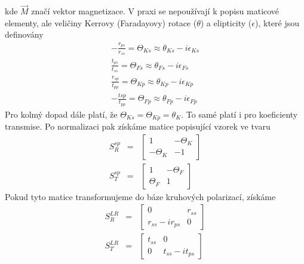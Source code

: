 kde $\vec{M}$ značí vektor magnetizace.
V praxi se nepoužívají k popisu maticové elementy, ale veličiny Kerrovy (Faradayovy) rotace ($\theta$)  a elipticity ($\epsilon$), které jsou definovány
\begin{eqnarray}
-\frac{r_{ps}}{r_{ss}}=\Theta_{Ks} \approx \theta_{Ks} -i\epsilon_{Ks} \\
\frac{t_{ps}}{t_{ss}}=\Theta_{Fs} \approx \theta_{Fs}-i\epsilon_{Fs} \\
\frac{r_{sp}}{t_{pp}} = \Theta_{Kp} \approx \theta_{Kp} -i\epsilon_{Kp}\\
-\frac{t{sp}}{t_{pp}} = \Theta_{Fp} \approx \theta_{Fp}-i\epsilon_{Fp}
\end{eqnarray}
Pro kolmý dopad dále platí, že $\Theta_{Ks}=\Theta_{Kp}=\theta_K$. To samé platí i pro koeficienty transmise. Po normalizaci pak získáme matice popisující vzorek ve tvaru
\begin{eqnarray}
S_R^{sp}&=&\begin{bmatrix}1&-\Theta_K \\ -\Theta_K & -1 \end{bmatrix} \\
S_T^{sp}&=&\begin{bmatrix}1&-\Theta_F \\ \Theta_F& 1 \end{bmatrix}
\end{eqnarray}
Pokud tyto matice transformujeme do báze kruhových polarizací, získáme
\begin{eqnarray}
S_R^{LR}&=&\begin{bmatrix}0 & r_{ss}\\ r_{ss}-ir_{ps}&0\end{bmatrix} \\
S_T^{LR}&=&\begin{bmatrix}t_{ss} & 0 \\ 0& t_{ss}-it_{ps}\end{bmatrix}
\end{eqnarray}
